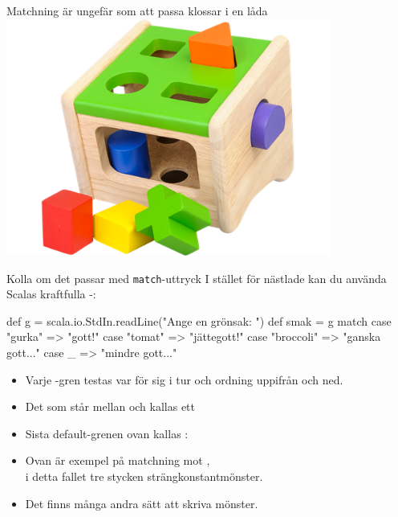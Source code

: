 \ifkompendium\else
\begin{SlideExtra}{Matchning är ungefär som att passa klossar i en låda}
\includegraphics[width=0.8\textwidth]{../img/plocklada.png}
\end{SlideExtra}
\fi


\begin{Slide}{Kolla om det passar med \texttt{match}-uttryck}\SlideFontSmall
I stället för nästlade  kan du använda Scalas kraftfulla -:

\begin{Code}
def g = scala.io.StdIn.readLine("Ange en grönsak: ")
def smak = g match 
  case "gurka"    => "gott!"
  case "tomat"    => "jättegott!"
  case "broccoli" => "ganska gott..."
  case _ => "mindre gott..."
\end{Code}
\begin{itemize}
\pause\item Varje -gren testas var för sig i tur och ordning uppifrån och ned.
\item Det som står mellan  och \code{=>} kallas ett  
\item Sista default-grenen ovan kallas : 
\item Ovan är exempel på matchning mot , \\ i detta fallet tre stycken strängkonstantmönster.
\item Det finns många andra sätt att skriva mönster.
\end{itemize}

\end{Slide}


